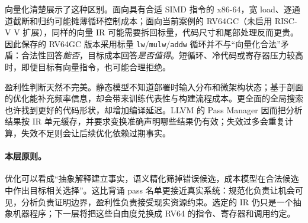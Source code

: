 向量化清楚展示了这种区别。面向具有合适 SIMD 指令的 x86-64，宽 load、逐通道截断和归约可能摊薄循环控制成本；面向当前案例的 RV64GC（未启用 RISC-V V 扩展），同样的向量 IR 可能需要拆回标量，代码尺寸和尾部处理反而更贵。因此保存的 RV64GC 版本采用标量 \texttt{lw}/\texttt{mulw}/\texttt{addw} 循环并不与“向量化合法”矛盾：合法性回答\emph{能否}，目标成本回答\emph{是否值得}。短循环、冷代码或寄存器压力较高时，即便目标有向量指令，也可能合理拒绝。

盈利性判断天然不完美。静态模型不知道部署时输入分布和微架构状态；基于剖面的优化能补充频率信息，却会带来训练代表性与构建流程成本。更全面的全局搜索也许找到更好的代码形状，却增加编译延迟。LLVM 的 Pass Manager 因而把分析结果按 IR 单元缓存，并要求变换准确声明哪些结果仍有效；失效过多会重复计算，失效不足则会让后续优化依赖过期事实\cite{llvm-newpm}。

\paragraph{本层原则。}
优化可以看成“抽象解释建立事实，语义精化筛掉错误候选，成本模型在合法候选中作出目标相关选择”。这比背诵 pass 名单更接近真实系统：规范化负责让机会可见，分析负责证明边界，盈利性负责接受现实资源约束。选定的 IR 仍只是一个抽象机器程序；下一层将把这些自由度兑换成 RV64 的指令、寄存器和调用约定。
